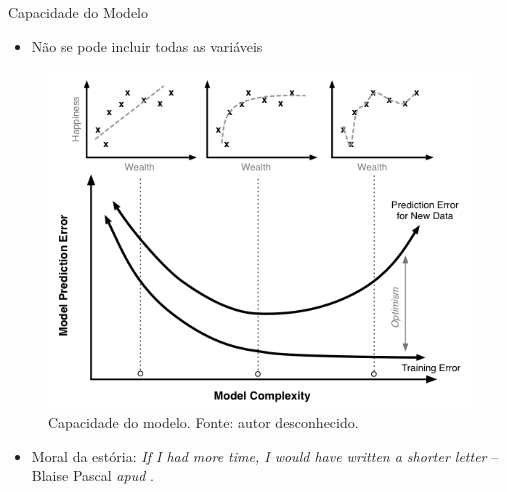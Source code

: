 \documentclass[9pt,ignorenonframetext,aspectratio=169]{beamer}
\providecommand{\tightlist}{%
  \setlength{\itemsep}{0pt}\setlength{\parskip}{0pt}}
\begin{document}
\begin{frame}{Capacidade do Modelo}
\protect\hypertarget{capacidade-do-modelo}{}

\begin{itemize}[<+->]
\tightlist
\item
  Não se pode incluir todas as variáveis
\end{itemize}

\begin{figure}

{\centering \includegraphics[width=0.4\linewidth]{../../images/model_complexity} 

}

\caption{Capacidade do modelo. Fonte: autor desconhecido.}\label{fig:unnamed-chunk-8}
\end{figure}

\begin{itemize}[<+->]
\tightlist
\item
  Moral da estória:
  \emph{If I had more time, I would have written a shorter
  letter} -- Blaise Pascal \emph{apud} \textcite{matloff2017}.
\end{itemize}

\end{frame}
\end{document}
